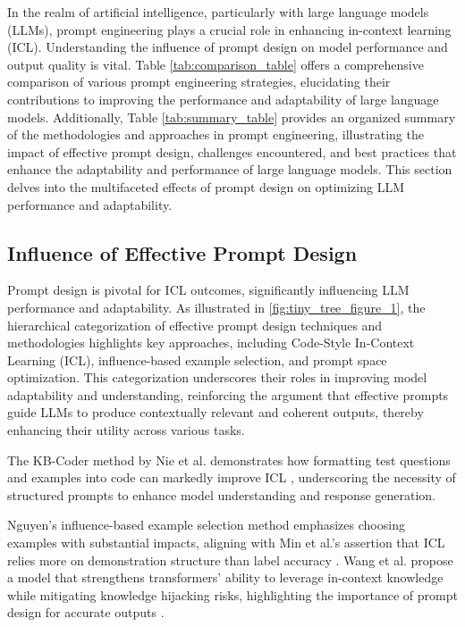

In the realm of artificial intelligence, particularly with large language models (LLMs), prompt engineering plays a crucial role in enhancing in-context learning (ICL). Understanding the influence of prompt design on model performance and output quality is vital. Table \ref{tab:comparison_table} offers a comprehensive comparison of various prompt engineering strategies, elucidating their contributions to improving the performance and adaptability of large language models. Additionally, Table \ref{tab:summary_table} provides an organized summary of the methodologies and approaches in prompt engineering, illustrating the impact of effective prompt design, challenges encountered, and best practices that enhance the adaptability and performance of large language models. This section delves into the multifaceted effects of prompt design on optimizing LLM performance and adaptability.




\subsection{Influence of Effective Prompt Design} \label{subsec:Influence of Effective Prompt Design}



Prompt design is pivotal for ICL outcomes, significantly influencing LLM performance and adaptability. As illustrated in \autoref{fig:tiny_tree_figure_1}, the hierarchical categorization of effective prompt design techniques and methodologies highlights key approaches, including Code-Style In-Context Learning (ICL), influence-based example selection, and prompt space optimization. This categorization underscores their roles in improving model adaptability and understanding, reinforcing the argument that effective prompts guide LLMs to produce contextually relevant and coherent outputs, thereby enhancing their utility across various tasks. 

The KB-Coder method by Nie et al. demonstrates how formatting test questions and examples into code can markedly improve ICL \cite{nie2024codestyleincontextlearningknowledgebased}, underscoring the necessity of structured prompts to enhance model understanding and response generation.

Nguyen's influence-based example selection method emphasizes choosing examples with substantial impacts, aligning with Min et al.'s assertion that ICL relies more on demonstration structure than label accuracy \cite{nguyen2023incontextexampleselectioninfluences,min2022rethinkingroledemonstrationsmakes}. Wang et al. propose a model that strengthens transformers' ability to leverage in-context knowledge while mitigating knowledge hijacking risks, highlighting the importance of prompt design for accurate outputs \cite{wang2024understandingknowledgehijackmechanism}.

